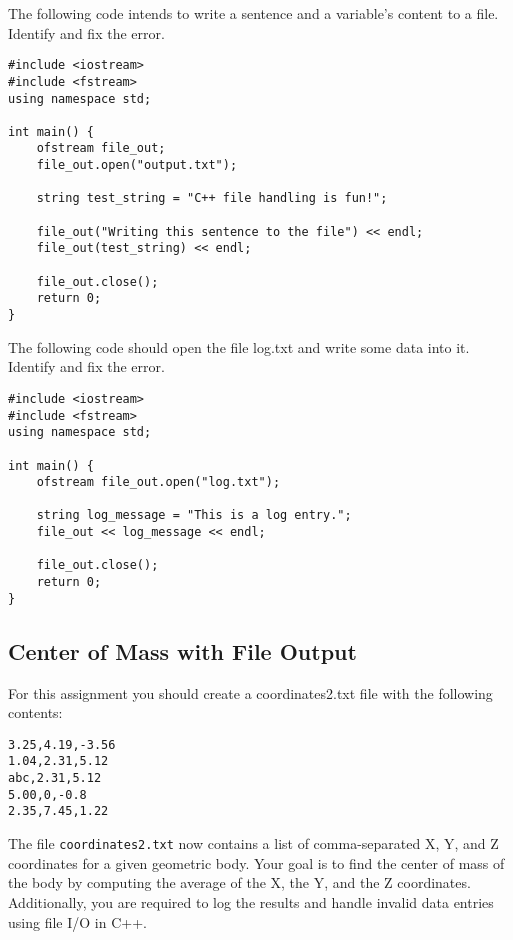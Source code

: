 \begin{multipart}
The following code intends to write a sentence and a variable's content to a file. Identify and fix the error.
\end{multipart}

\begin{verbatim}
#include <iostream>
#include <fstream>
using namespace std;

int main() {
    ofstream file_out;
    file_out.open("output.txt");

    string test_string = "C++ file handling is fun!";
    
    file_out("Writing this sentence to the file") << endl;
    file_out(test_string) << endl;

    file_out.close();
    return 0;
}
\end{verbatim}

\begin{multipart}
The following code should open the file log.txt and write some data into it. Identify and fix the error.
\end{multipart}

\begin{verbatim}
#include <iostream>
#include <fstream>
using namespace std;

int main() {
    ofstream file_out.open("log.txt");

    string log_message = "This is a log entry.";
    file_out << log_message << endl;

    file_out.close();
    return 0;
}
\end{verbatim}

\newpage

\subsection{Center of Mass with File Output}
For this assignment you should create a coordinates2.txt file with the following contents:
\begin{verbatim}
3.25,4.19,-3.56
1.04,2.31,5.12
abc,2.31,5.12
5.00,0,-0.8
2.35,7.45,1.22
\end{verbatim}


The file \texttt{coordinates2.txt} now contains a list of comma-separated X, Y, and Z coordinates for a given geometric body. Your goal is to find the center of mass of the body by computing the average of the X, the Y, and the Z coordinates. Additionally, you are required to log the results and handle invalid data entries using file I/O in C++.

